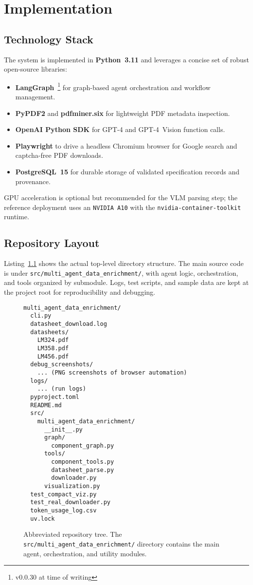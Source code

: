 \chapter{Implementation}
\label{chapter:implementation}

\section{Technology Stack}
The system is implemented in \textbf{Python~3.11} and leverages a concise set of robust open-source libraries:
\begin{itemize}
  \item \textbf{LangGraph}~\footnote{v0.0.30 at time of writing} for graph-based agent orchestration and workflow management.
  \item \textbf{PyPDF2} and \textbf{pdfminer.six} for lightweight PDF metadata inspection.
  \item \textbf{OpenAI Python SDK} for GPT-4 and GPT-4~Vision function calls.
  \item \textbf{Playwright} to drive a headless Chromium browser for Google search and captcha-free PDF downloads.
  \item \textbf{PostgreSQL~15} for durable storage of validated specification records and provenance.
\end{itemize}
GPU acceleration is optional but recommended for the VLM parsing step; the reference deployment uses an \texttt{NVIDIA~A10} with the \texttt{nvidia-container-toolkit} runtime.

\section{Repository Layout}
Listing~\ref{lst:tree} shows the actual top-level directory structure. The main source code is under \texttt{src/multi\_agent\_data\_enrichment/}, with agent logic, orchestration, and tools organized by submodule. Logs, test scripts, and sample data are kept at the project root for reproducibility and debugging.

\begin{figure}[H]
\centering
\begin{minipage}{0.9\textwidth}
\begin{verbatim}
multi_agent_data_enrichment/
  cli.py
  datasheet_download.log
  datasheets/
    LM324.pdf
    LM358.pdf
    LM456.pdf
  debug_screenshots/
    ... (PNG screenshots of browser automation)
  logs/
    ... (run logs)
  pyproject.toml
  README.md
  src/
    multi_agent_data_enrichment/
      __init__.py
      graph/
        component_graph.py
      tools/
        component_tools.py
        datasheet_parse.py
        downloader.py
      visualization.py
  test_compact_viz.py
  test_real_downloader.py
  token_usage_log.csv
  uv.lock
\end{verbatim}
\end{minipage}
\caption{Abbreviated repository tree. The \texttt{src/multi\_agent\_data\_enrichment/} directory contains the main agent, orchestration, and utility modules.}
\label{lst:tree}
\end{figure}

